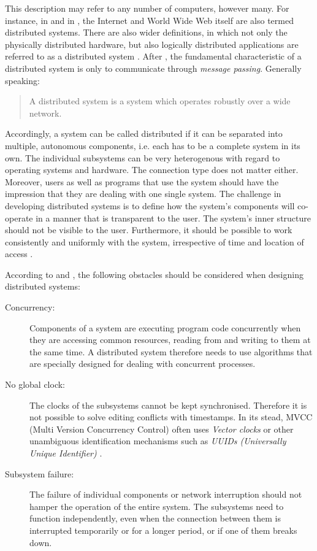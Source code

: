 This description may refer to any number of computers, however many. For instance, in  and in , the Internet and World Wide Web itself are also termed distributed systems. There are also wider definitions, in which not only the physically distributed hardware, but also logically distributed applications are referred to as a distributed system . After , the fundamental characteristic of a distributed system is only to communicate through \textit{message passing}. Generally speaking:

\begin{quote}
A distributed system is a system which operates robustly over a wide network. 
\end{quote}

Accordingly, a system can be called distributed if it can be separated into multiple, autonomous components, i.e. each has to be a complete system in its own. The individual subsystems can be very heterogenous with regard to operating systems and hardware. The connection type does not matter either. Moreover, users as well as programs that use the system should have the impression that they are dealing with one single system. The challenge in developing distributed systems is to define how the system's components will co-operate in a manner that is transparent to the user. The system's inner structure should not be visible to the user. Furthermore, it should be possible to work consistently and uniformly with the system, irrespective of time and location of access .

According to  and , the following obstacles should be considered when designing distributed systems:

\begin{description}
  \item[Concurrency:] Components of a system are executing program code concurrently when they are accessing common resources, reading from and writing to them at the same time. A distributed system therefore needs to use algorithms that are specially designed for dealing with concurrent processes.
  \item[No global clock:] The clocks of the subsystems cannot be kept synchronised. Therefore it is not possible to solve editing conflicts with timestamps. In its stead, MVCC (Multi Version Concurrency Control) often uses \textit{Vector clocks}  or other unambiguous identification mechanisms such as \textit{UUIDs (Universally Unique Identifier)} \cite{uuids}.
  \item[Subsystem failure:] The failure of individual components or network interruption should not hamper the operation of the entire system. The subsystems need to function independently, even when the connection between them is interrupted temporarily or for a longer period, or if one of them breaks down.
\end{description}

